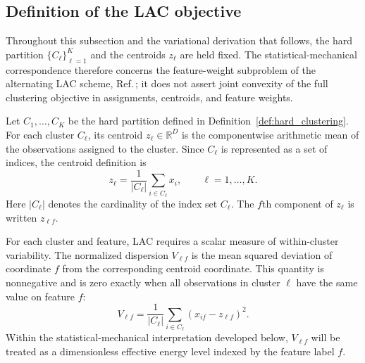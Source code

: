 \documentclass[11pt,a4paper]{article}
\newcommand{\R}{\mathbb{R}}
\theoremstyle{definition}
\theoremstyle{plain}
\begin{document}
\subsection{Definition of the LAC objective}
\label{subsec:lac_definition}

Throughout this subsection and the variational derivation that follows, the hard partition $\{C_\ell\}_{\ell=1}^{K}$ and the centroids $z_\ell$ are held fixed. The statistical-mechanical correspondence therefore concerns the feature-weight subproblem of the alternating LAC scheme, Ref.\,\cite{domeniconi2007lac}; it does not assert joint convexity of the full clustering objective in assignments, centroids, and feature weights.

Let $C_1,\ldots,C_K$ be the hard partition defined in Definition~\ref{def:hard_clustering}. For each cluster $C_\ell$, its centroid $z_\ell\in\R^D$ is the componentwise arithmetic mean of the observations assigned to the cluster. Since $C_\ell$ is represented as a set of indices, the centroid definition is
\begin{equation}
    z_\ell
    =\frac{1}{|C_\ell|}\sum_{i\in C_\ell}x_i,
    \qquad
    \ell=1,\ldots,K.
    \label{eq:lac_centroid}
\end{equation}
Here $|C_\ell|$ denotes the cardinality of the index set $C_\ell$. The $f$th component of $z_\ell$ is written $z_{\ell f}$.

For each cluster and feature, LAC requires a scalar measure of within-cluster variability. The normalized dispersion $V_{\ell f}$ is the mean squared deviation of coordinate $f$ from the corresponding centroid coordinate. This quantity is nonnegative and is zero exactly when all observations in cluster $\ell$ have the same value on feature $f$:
\begin{equation}
    V_{\ell f}
    =\frac{1}{|C_\ell|}
      \sum_{i\in C_\ell}
      (x_{if}-z_{\ell f})^2.
    \label{eq:lac_dispersion}
\end{equation}
Within the statistical-mechanical interpretation developed below, $V_{\ell f}$ will be treated as a dimensionless effective energy level indexed by the feature label $f$.
\end{document}
